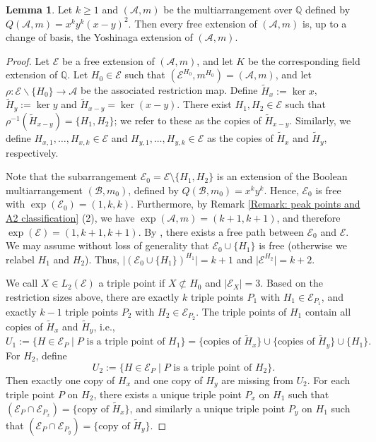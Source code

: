 \documentclass[12pt]{amsart}
\theoremstyle{definition}
\newtheorem{lemma}[theorem]{Lemma}
\theoremstyle{remark}
\newcommand\CA{{\mathscr A}}
\newcommand\CE{{\mathscr E}}
\newcommand\CB{{\mathscr B}}
\newcommand\BBQ{{\mathbb Q}}
\begin{document}
\begin{lemma}\label{lemma: main theorem deletion free}
    Let $k\ge 1$ and $(\CA,m)$ be the multiarrangement over $\BBQ$ defined by $Q(\CA,m) = x^ky^k(x-y)^2$. Then every free extension 
of $(\CA,m)$ is, up to a change of basis, the Yoshinaga extension of $(\CA,m)$.
\end{lemma}
\begin{proof}
Let $\CE$ be a free extension of $(\CA,m)$, and let $K$ be the corresponding field extension of $\BBQ$.
Let $H_0 \in \CE$ such that $(\CE^{H_0},m^{H_0})=(\CA,m)$, and let $\rho \colon \CE\backslash\{H_0\} \rightarrow \CA$ be the associated restriction map. Define $\tilde H_x := \ker x$, $\tilde H_y := \ker y$ and $\tilde H_{x-y} = \ker (x-y)$. There exist $H_1,H_2 \in \CE$ such that $\rho^{-1} (\tilde H_{x-y}) = \{H_1,H_2\}$; we refer to these as the copies of $\tilde H_{x-y}$. Similarly, we define $H_{x,1}, \ldots, H_{x,k} \in \CE$ and $H_{y,1},\ldots, H_{y,k}\in \CE$ as the copies of $\tilde H_x$ and $\tilde H_y$, respectively. 

Note that the subarrangement $\CE_0 = \CE \setminus \{H_1,H_2\}$ is an extension of the Boolean multiarrangement $(\CB,m_0)$, defined by $Q(\CB,m_0) = x^ky^k$. Hence, $\CE_0$ is free with $\exp(\CE_0) = (1,k,k)$. Furthermore, by Remark \ref{Remark: peak points and A2 classification} (2), we have $\exp(\CA,m) = (k+1,k+1)$, and therefore $\exp(\CE) = (1,k+1,k+1)$. 
By \cite[Thm.~1.2]{2306.11310}, there exists a free path between $\CE_0$ and $\CE$. We may assume without loss of generality that $\CE_0 \cup \{H_1\}$ is free (otherwise we relabel $H_1$ and $H_2$).
Thus, $\vert (\CE_0\cup \{H_1\})^{H_1} \vert = k+1$ and $\vert \CE^{H_2} \vert = k+2$.

We call $X \in L_2(\CE)$ a triple point if $X \not\subset H_0$ and $\vert\CE_X\vert = 3$. Based on the restriction sizes above, there are exactly $k$ triple points $P_1$ with $H_1 \in \CE_{P_1}$, and
exactly $k-1$ triple points $P_2$ with $H_2 \in \CE_{P_2}$. The triple points of $H_1$ contain all copies of $\tilde H_x$ and $\tilde H_y$, i.e., 
$$
U_1 := \{H \in \CE_P \mid P \text{ is a triple point of } H_1 \} = \{\text{copies of } \tilde H_x \} \cup \{\text{copies of } \tilde H_y \} \cup \{H_1\}.
$$
For $H_2$, define 
$$
U_2 := \{H \in \CE_P \mid P \text{ is a triple point of } H_2 \}. 
$$
Then exactly one copy of $H_x$ and one copy of $H_y$ are missing from $U_2$. For each triple point $P$
on $H_2$, there exists a unique triple point $P_x$ on $H_1$ such that $(\CE_P \cap \CE_{P_x}) = \{\text{copy of } \tilde H_x\}$, and similarly a unique triple point $P_y$ on $H_1$ such that 
$(\CE_{P} \cap \CE_{P_y}) = \{\text{copy of } \tilde H_y\}$. 


\end{proof}
\end{document}

